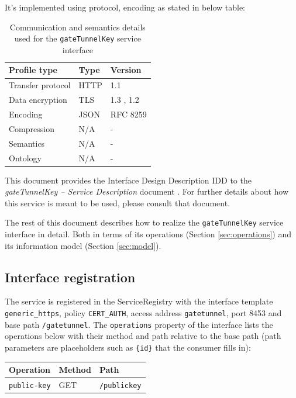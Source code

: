 \documentclass[a4paper]{arrowhead}
\begin{document}
It's implemented using protocol, encoding as stated in below table:
\begin{table}[ht!]
  \centering
  \begin{tabular}{|l|l|l|}
    \hline
    \rowcolor{gray!33} Profile type & Type & Version \\ \hline
    Transfer protocol & HTTP & 1.1 \cite{rfc9112} \\ \hline
    Data encryption & TLS & 1.3 \cite{rfc8446}, 1.2 \cite{rfc5246} \\ \hline
    Encoding & JSON & RFC 8259 \cite{rfc8259} \\ \hline
    Compression & N/A & - \\ \hline
    Semantics & N/A & - \\ \hline
    Ontology & N/A & - \\ \hline
  \end{tabular}
  \caption{Communication and semantics details used for the \texttt{gateTunnelKey} service interface}
  \label{tab:comunication_semantics_profile}
\end{table}

This document provides the Interface Design Description IDD to the \textit{gateTunnelKey -- Service Description} document \cite{gt-gateTunnelKey-sd}.
For further details about how this service is meant to be used, please consult that document.

The rest of this document describes how to realize the \texttt{gateTunnelKey} service
interface in detail. Both in terms of its operations (Section \ref{sec:operations}) and its information model (Section \ref{sec:model}).

\subsection{Interface registration}

The service is registered in the ServiceRegistry with the interface template \texttt{generic\_\allowbreak{}https}, policy \texttt{CERT\_\allowbreak{}AUTH}, access address \texttt{gatetunnel}, port 8453 and base path \texttt{/\allowbreak{}gatetunnel}. The \texttt{operations} property of the interface lists the operations below with their method and path relative to the base path (path parameters are placeholders such as \texttt{\{id\}} that the consumer fills in):

\noindent\begin{longtable}{| p{5.2cm} | p{1.6cm} | p{8.4cm} |} \hline
\rowcolor{gray!33} Operation & Method & Path \\ \hline \endhead
\texttt{public-\allowbreak{}key} & GET & \texttt{/\allowbreak{}publickey} \\ \hline
\end{longtable}
\end{document}
